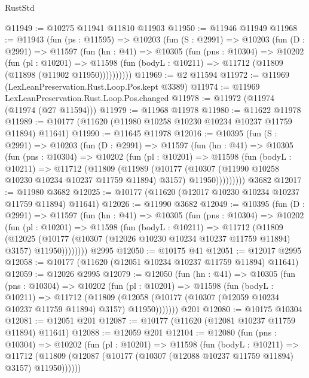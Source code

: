 \begin{lexlean}{RustStd}
\begin{coremodule}
@11949 := @10275 @11941 @11810 @11903
@11950 := @11946 @11949
@11968 := @11943
    (fun (ps : @11595) =>
    @10203
      (fun (S : @2991) =>
      @10203
        (fun (D : @2991) =>
        @11597
          (fun (hn : @41) =>
          @10305
            (fun (pns : @10304) =>
            @10202
              (fun (pl : @10201) =>
              @11598 (fun (bodyL : @10211) => @11712 (@11809 (@11898 (@11902 @11950))))))))))
@11969 := @2 @11594
@11972 := @11969 (LexLeanPreservation.Rust.Loop.Pos.kept @3389)
@11974 := @11969 LexLeanPreservation.Rust.Loop.Pos.changed
@11978 := @11972 (@11974 (@11974 (@27 @11594)))
@11979 := @11968 @11978
@11980 := @11622 @11978
@11989 := @10177 (@11620 (@11980 @10258 @10230 @10234 @10237 @11759 @11894) @11641)
@11990 := @11645 @11978
@12016 := @10395
    (fun (S : @2991) =>
    @10203
      (fun (D : @2991) =>
      @11597
        (fun (hn : @41) =>
        @10305
          (fun (pns : @10304) =>
          @10202
            (fun (pl : @10201) =>
            @11598
              (fun (bodyL : @10211) =>
              @11712
                (@11809
                  (@11989
                    (@10177
                      (@10307 (@11990 @10258 @10230 @10234 @10237 @11759 @11894) @3157)
                      @11950)))))))))
    @3682
@12017 := @11980 @3682
@12025 := @10177 (@11620 (@12017 @10230 @10234 @10237 @11759 @11894) @11641)
@12026 := @11990 @3682
@12049 := @10395
    (fun (D : @2991) =>
    @11597
      (fun (hn : @41) =>
      @10305
        (fun (pns : @10304) =>
        @10202
          (fun (pl : @10201) =>
          @11598
            (fun (bodyL : @10211) =>
            @11712
              (@11809
                (@12025
                  (@10177 (@10307 (@12026 @10230 @10234 @10237 @11759 @11894) @3157) @11950))))))))
    @2995
@12050 := @10175 @41
@12051 := @12017 @2995
@12058 := @10177 (@11620 (@12051 @10234 @10237 @11759 @11894) @11641)
@12059 := @12026 @2995
@12079 := @12050
    (fun (hn : @41) =>
    @10305
      (fun (pns : @10304) =>
      @10202
        (fun (pl : @10201) =>
        @11598
          (fun (bodyL : @10211) =>
          @11712
            (@11809
              (@12058 (@10177 (@10307 (@12059 @10234 @10237 @11759 @11894) @3157) @11950)))))))
    @201
@12080 := @10175 @10304
@12081 := @12051 @201
@12087 := @10177 (@11620 (@12081 @10237 @11759 @11894) @11641)
@12088 := @12059 @201
@12104 := @12080
    (fun (pns : @10304) =>
    @10202
      (fun (pl : @10201) =>
      @11598
        (fun (bodyL : @10211) =>
        @11712 (@11809 (@12087 (@10177 (@10307 (@12088 @10237 @11759 @11894) @3157) @11950))))))

\end{coremodule}
\end{lexlean}
